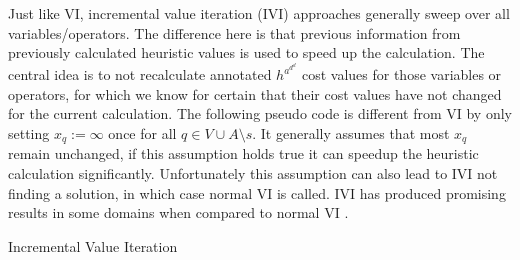 Just like VI, incremental value iteration (IVI) approaches generally sweep over all variables/operators. The difference here is that previous information from previously calculated heuristic values is used to speed up the calculation. The central idea is to not recalculate annotated $h^a^d^d$ cost values for those variables or operators, for which we know for certain that their cost values have not changed for the current calculation. The following pseudo code is different from VI by only setting $x_q := \infty$ once for all $q \in V \cup A \setminus s$. It generally assumes that most $x_q$ remain unchanged, if this assumption holds true it can speedup the heuristic calculation significantly. Unfortunately this assumption can also lead to IVI not finding a solution, in which case normal VI is called. IVI has produced promising results in some domains when compared to normal VI \cite{main}.  \\

\newpage

\begin{algorithm*}[H]
 \caption{Incremental Value Iteration}
\end{algorithm*}




\iffalse 



